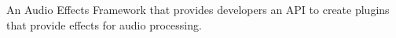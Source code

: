 An Audio Effects Framework that provides developers an A\+PI to create plugins that provide effects for audio processing. 